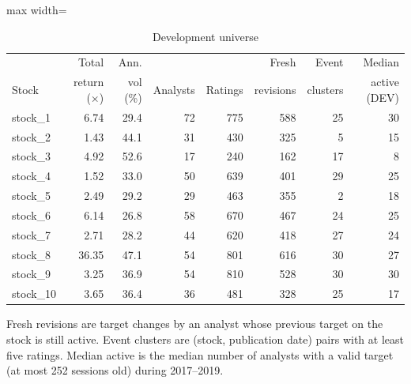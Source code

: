 \begin{table}[t]
\centering\small
\caption{Development universe}\label{tab:universe}
\begin{adjustbox}{max width=\textwidth}\begin{tabular}{lrrrrrrr}
\toprule
 & Total & Ann. & & & Fresh & Event & Median \\
Stock & return ($\times$) & vol (\%) & Analysts & Ratings & revisions & clusters & active (DEV)\\
\midrule
stock\_1 & 6.74 & 29.4 & 72 & 775 & 588 & 25 & 30\\
stock\_2 & 1.43 & 44.1 & 31 & 430 & 325 & 5 & 15\\
stock\_3 & 4.92 & 52.6 & 17 & 240 & 162 & 17 & 8\\
stock\_4 & 1.52 & 33.0 & 50 & 639 & 401 & 29 & 25\\
stock\_5 & 2.49 & 29.2 & 29 & 463 & 355 & 2 & 18\\
stock\_6 & 6.14 & 26.8 & 58 & 670 & 467 & 24 & 25\\
stock\_7 & 2.71 & 28.2 & 44 & 620 & 418 & 27 & 24\\
stock\_8 & 36.35 & 47.1 & 54 & 801 & 616 & 30 & 27\\
stock\_9 & 3.25 & 36.9 & 54 & 810 & 528 & 30 & 30\\
stock\_10 & 3.65 & 36.4 & 36 & 481 & 328 & 25 & 17\\
\bottomrule
\end{tabular}\end{adjustbox}
\par\smallskip\begin{minipage}{0.92\textwidth}\footnotesize Fresh revisions are target changes by an analyst whose previous target on the stock is still active. Event clusters are (stock, publication date) pairs with at least five ratings. Median active is the median number of analysts with a valid target (at most 252 sessions old) during 2017--2019.\end{minipage}
\end{table}
